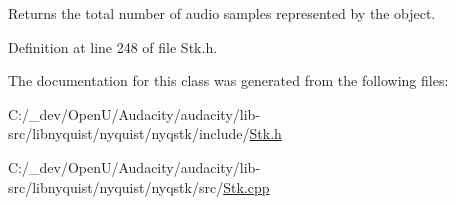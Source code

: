 Returns the total number of audio samples represented by the object. 



Definition at line 248 of file Stk.\+h.



The documentation for this class was generated from the following files\+:\begin{DoxyCompactItemize}
\item 
C\+:/\+\_\+dev/\+Open\+U/\+Audacity/audacity/lib-\/src/libnyquist/nyquist/nyqstk/include/\hyperlink{_stk_8h}{Stk.\+h}\item 
C\+:/\+\_\+dev/\+Open\+U/\+Audacity/audacity/lib-\/src/libnyquist/nyquist/nyqstk/src/\hyperlink{_stk_8cpp}{Stk.\+cpp}\end{DoxyCompactItemize}
